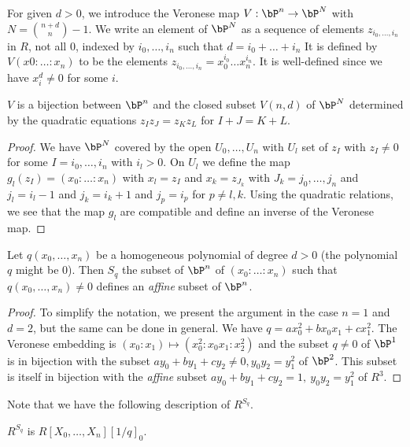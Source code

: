 For given $d>0$, we introduce the Veronese map $V: \bP^n\rightarrow \bP^N$ with $N = \binom{n+d}{n}-1$.
We write an element of $\bP^N$ as a sequence of elements $z_{i_0,\dots,i_n}$ in $R$, not all $0$,
indexed by $i_0,\dots,i_n$ such that $d = i_0+\dots+i_n$
It is defined by $V(x0:\dots:x_n)$ to be the elements $z_{i_0,\dots,i_n} = x_0^{i_0}\dots x_n^{i_n}$. It is well-defined
since we have $x_i^d\neq 0$ for some $i$.

\begin{proposition}\label{veronese}
  $V$ is a bijection between $\bP^n$ and the closed subset $V(n,d)$ of $\bP^N$ determined by the quadratic
  equations $z_Iz_J = z_Kz_L$ for $I+J=K+L$.
\end{proposition}

\begin{proof}
  We have $\bP^N$ covered by the open $U_0,\dots,U_n$ with $U_l$ set of $z_I$ with $z_I\neq 0$
  for some $I = i_0,\dots,i_n$ with $i_l>0$. On $U_l$ we define the map $g_l(z_I) = (x_0:\dots:x_n)$
  with $x_l = z_I$ and $x_k = z_{J_k}$ with $J_k = j_0,\dots,j_n$ and $j_l = i_l-1$ and $j_k = i_k+1$
  and $j_p = i_p$ for $p\neq l,k$. Using the quadratic relations, we see that the map $g_l$
  are compatible and define an inverse of the Veronese map.
\end{proof}

\begin{corollary}\label{affine}
  Let $q(x_0,\dots,x_n)$ be a homogeneous polynomial of degree $d>0$ (the polynomial $q$ might be $0$). Then $S_q$ the subset
  of $\bP^n$ of $(x_0:\dots:x_n)$ such that $q(x_0,\dots,x_n)\neq 0$
  defines an {\em affine} subset of $\bP^n$.
\end{corollary}

\begin{proof}
  To simplify the notation, we present the argument in the case $n=1$ and $d=2$, but the same can be done
  in general. We have $q = ax_0^2 + bx_0x_1+cx_1^2$. The Veronese embedding is $(x_0:x_1)\mapsto (x_0^2:x_0x_1:x_2^2)$
  and the subset $q\neq 0$ of $\bP^1$ is in bijection with the subset $ay_0+by_1+cy_2\neq 0, y_0y_2 = y_1^2$ of $\bP^2$.
  This subset is itself in bijection with the {\em affine} subset $ay_0+by_1+cy_2 = 1, ~y_0y_2=y_1^2$ of $R^3$.
\end{proof}

Note that we have the following description of $R^{S_q}$.

 \begin{lemma}
   $R^{S_q}$ is  $R[X_0,\dots,X_n][1/q]_0$.
\end{lemma}

